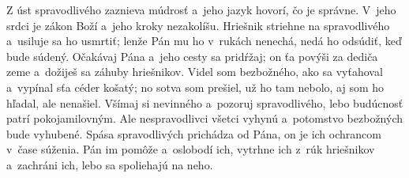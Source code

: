\versseparator
Z úst spravodlivého zaznieva múdrosť
a~jeho jazyk hovorí, čo je správne.
\versseparator
V~jeho srdci je zákon Boží
a~jeho kroky nezakolíšu.
\versseparator
Hriešnik striehne na spravodlivého
a~usiluje sa ho usmrtiť;
\versseparator
lenže Pán mu ho v~rukách nenechá,
nedá ho odsúdiť, keď bude súdený.
\versseparator
Očakávaj Pána a~jeho cesty sa pridŕžaj;
on ťa povýši za dediča zeme
a~dožiješ sa záhuby hriešnikov.
\versseparator
Videl som bezbožného, ako sa vyťahoval
a~vypínal sťa céder košatý;
\versseparator
no sotva som prešiel, už ho tam nebolo,
aj som ho hľadal, ale nenašiel.
\versseparator
Všímaj si nevinného a~pozoruj spravodlivého,
lebo budúcnosť patrí pokojamilovným.
\versseparator
Ale nespravodlivci všetci vyhynú
a~potomstvo bezbožných bude vyhubené.
\versseparator
Spása spravodlivých prichádza od Pána,
on je ich ochrancom v~čase súženia.
\versseparator
Pán im pomôže a~oslobodí ich,
vytrhne ich z~rúk hriešnikov a~zachráni ich,
lebo sa spoliehajú na neho.